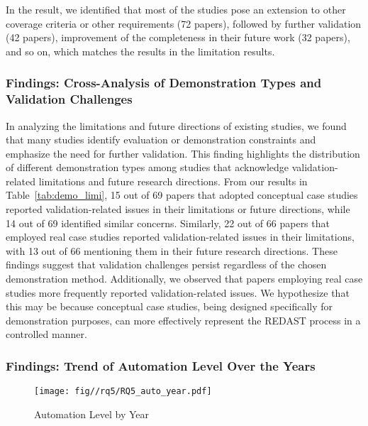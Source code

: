 In the result, we identified that most of the studies pose an extension to other coverage criteria or other requirements (72 papers), followed by further validation (42 papers), improvement of the completeness in their future work (32 papers), and so on, which matches the results in the limitation results. 

\subsubsection{Findings: Cross-Analysis of Demonstration Types and Validation Challenges}



In analyzing the limitations and future directions of existing studies, we found that many studies identify evaluation or demonstration constraints and emphasize the need for further validation. This finding highlights the distribution of different demonstration types among studies that acknowledge validation-related limitations and future research directions. From our results in Table~\ref{tab:demo_limi}, 15 out of 69 papers that adopted conceptual case studies reported validation-related issues in their limitations or future directions, while 14 out of 69 identified similar concerns. Similarly, 22 out of 66 papers that employed real case studies reported validation-related issues in their limitations, with 13 out of 66 mentioning them in their future research directions. These findings suggest that validation challenges persist regardless of the chosen demonstration method. Additionally, we observed that papers employing real case studies more frequently reported validation-related issues. We hypothesize that this may be because conceptual case studies, being designed specifically for demonstration purposes, can more effectively represent the REDAST process in a controlled manner.

\subsubsection{Findings: Trend of Automation Level Over the Years}
\begin{figure}
    \centering
    \texttt{[image: fig//rq5/RQ5\_auto\_year.pdf]}
    \caption{Automation Level by Year}
    \label{fig:auto_year}
\end{figure}

